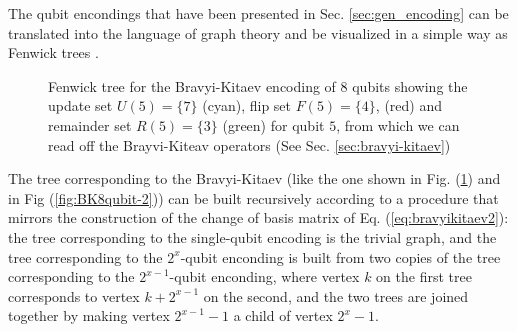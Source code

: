 The qubit encondings that have been presented in Sec. \ref{sec:gen_encoding} can be translated into the language of graph theory and be visualized in a simple way as Fenwick trees \cite{Havlek2017}.
\begin{figure}
\centering
{}
\caption{Fenwick tree for the Bravyi-Kitaev encoding of 8 qubits showing the update set $U(5) = \{7\}$ (cyan), flip set $F(5) = \{4\}$, (red) and remainder set $R(5) = \{3\}$ (green) for qubit $5$, from which we can read off the Brayvi-Kiteav operators (See Sec. \ref{sec:bravyi-kitaev})}
\label{fig:BK8qubit-5}
\end{figure}
The tree corresponding to the Bravyi-Kitaev (like the one shown in Fig. (\ref{fig:BK8qubit-5}) and in Fig (\ref{fig:BK8qubit-2})) can be built recursively according to a procedure that mirrors the construction of the change of basis matrix of Eq. (\ref{eq:bravyikitaev2}): the tree corresponding to the single-qubit encoding is the trivial graph, and the tree corresponding to the $2^x$-qubit enconding is built from two copies of the tree corresponding to the $2^{x-1}$-qubit enconding, where vertex $k$ on the first tree corresponds to vertex $k + 2^{x-1}$ on the second, and the two trees are joined together by making vertex $2^{x-1} - 1$ a child of vertex $2^x  - 1$.
